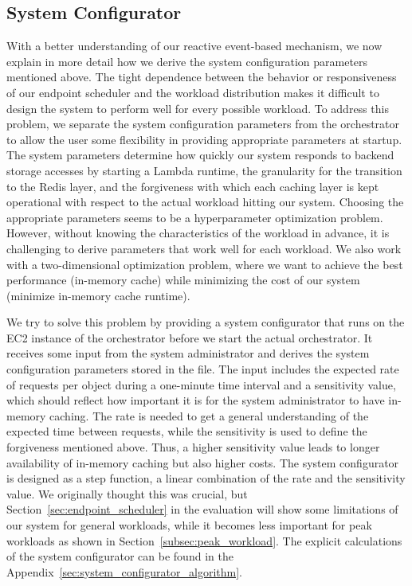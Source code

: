 \subsection{System Configurator}
\label{subsec:system_configurator}
With a better understanding of our reactive event-based mechanism, we now explain in more detail how we derive the system configuration parameters mentioned above. The tight dependence between the behavior or responsiveness of our endpoint scheduler and the workload distribution makes it difficult to design the system to perform well for every possible workload. To address this problem, we separate the system configuration parameters from the orchestrator to allow the user some flexibility in providing appropriate parameters at startup. The system parameters determine how quickly our system responds to backend storage accesses by starting a Lambda runtime, the granularity for the transition to the Redis layer, and the forgiveness with which each caching layer is kept operational with respect to the actual workload hitting our system. Choosing the appropriate parameters seems to be a hyperparameter optimization problem. However, without knowing the characteristics of the workload in advance, it is challenging to derive parameters that work well for each workload. We also work with a two-dimensional optimization problem, where we want to achieve the best performance (in-memory cache) while minimizing the cost of our system (minimize in-memory cache runtime). 

\newpage
\noindent
We try to solve this problem by providing a system configurator that runs on the EC2 instance of the orchestrator before we start the actual orchestrator. It receives some input from the system administrator and derives the system configuration parameters stored in the  file. The input includes the expected rate of requests per object during a one-minute time interval and a sensitivity value, which should reflect how important it is for the system administrator to have in-memory caching. The rate is needed to get a general understanding of the expected time between requests, while the sensitivity is used to define the forgiveness mentioned above. Thus, a higher sensitivity value leads to longer availability of in-memory caching but also higher costs. The system configurator is designed as a step function, a linear combination of the rate and the sensitivity value. We originally thought this was crucial, but Section~\ref{sec:endpoint_scheduler} in the evaluation will show some limitations of our system for general workloads, while it becomes less important for peak workloads as shown in Section~\ref{subsec:peak_workload}. The explicit calculations of the system configurator can be found in the Appendix~\ref{sec:system_configurator_algorithm}. 

